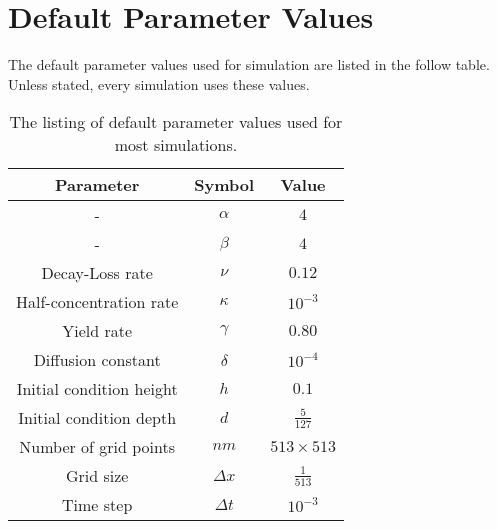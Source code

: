 
\pagestyle{appendix-param}
\chapter{Default Parameter Values}

The default parameter values used for simulation are listed in the follow table. Unless stated, every simulation uses these values.

\begin{table}[h!tb]
  \centering
  \begin{tabular}{| c | c | c |}
    \hline
    Parameter & Symbol & Value \\
    \hline
    - & $\alpha$    & $4$ \\
    - & $\beta$     & $4$ \\
    Decay-Loss rate & $\nu$       & $0.12$ \\
    Half-concentration rate & $\kappa$    & $10^{-3}$ \\
    Yield rate & $\gamma$    & $0.80$ \\
    Diffusion constant & $\delta$    & $10^{-4}$ \\
    \hline
    Initial condition height & $h$ & $0.1$ \\
    Initial condition depth & $d$ & $\frac{5}{127}$ \\
    \hline
    Number of grid points & $nm$ & $513 \times 513$ \\
    Grid size & $\Delta x$  & $\frac{1}{513}$ \\
    Time step & $\Delta t$  & $10^{-3}$ \\
    \hline
  \end{tabular}
  \caption{The listing of default parameter values used for most simulations.}
  \label{tab:default-parameters}
\end{table}

